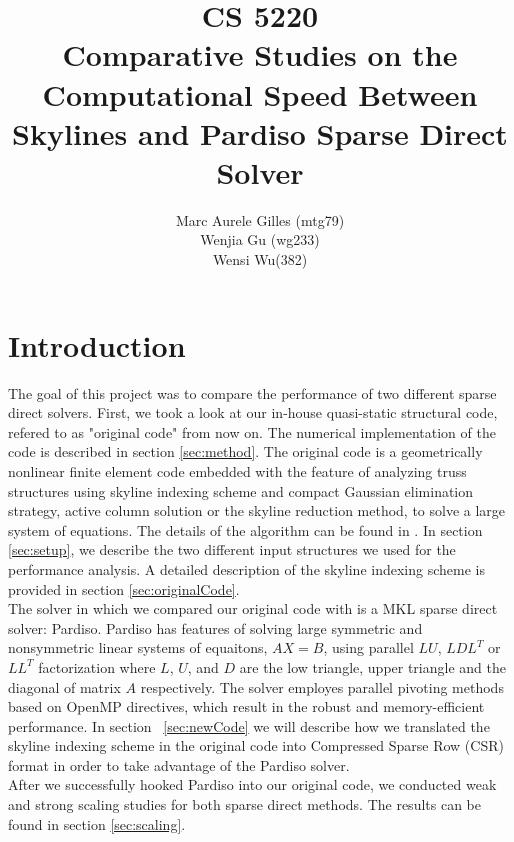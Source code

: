 \documentclass[11pt]{article}
\begin{document}
\title{CS 5220\\ Comparative Studies on the Computational Speed Between Skylines and Pardiso Sparse Direct Solver}
\author{Marc Aurele Gilles (mtg79)\\ Wenjia Gu (wg233)\\Wensi Wu(382) }
\maketitle

\section{Introduction}\label{sec:intro}

The goal of this project was to compare the performance of two different sparse direct solvers. First, we took a look at our in-house quasi-static structural code, refered to as "original code" from now on. The numerical implementation of the code is described in section \ref{sec:method}.  The original code is a geometrically nonlinear finite element code embedded with the feature of analyzing truss structures using skyline indexing scheme and compact Gaussian elimination strategy, active column solution or the skyline reduction method, to solve a large system of equations. The details of the algorithm can be found in \cite{Bathe}. In section \ref{sec:setup}, we describe the two different input structures we used for the performance analysis.  A detailed description of the skyline indexing scheme is provided in section \ref{sec:originalCode}. \\

The solver in which we compared our original code with is a MKL sparse direct solver: Pardiso. Pardiso has features of solving large symmetric and nonsymmetric linear systems of equaitons, $AX=B$, using parallel $LU$, $LDL^T$ or $LL^T$ factorization where $L$, $U$, and $D$ are the low triangle, upper triangle and the diagonal of matrix $A$ respectively. The solver employes parallel pivoting methods based on OpenMP directives, which result in the robust and memory-efficient performance. In section ~\ref{sec:newCode} we will describe how we translated the skyline indexing scheme in the original code into Compressed Sparse Row (CSR) format in order to take advantage of the Pardiso solver.\\

After we successfully hooked Pardiso into our original code, we conducted weak and strong scaling studies for both sparse direct methods. The results can be found in section \ref{sec:scaling}.  
\end{document}
